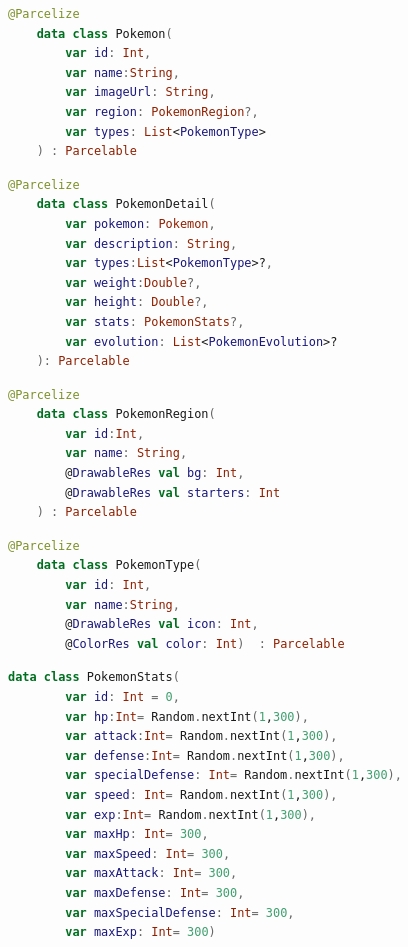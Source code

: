 \documentclass[a4paper, 12pt]{article}
\begin{document}
\begin{lstlisting}[caption={Pokemon Data Class.}, label={code:pk_class}, language=Kotlin]
    @Parcelize
    data class Pokemon(
        var id: Int,
        var name:String,
        var imageUrl: String,
        var region: PokemonRegion?,
        var types: List<PokemonType>
    ) : Parcelable
\end{lstlisting}

\begin{lstlisting}[caption={Pokemon Detail Data Class.}, label={code:pk_detail_class}, language=Kotlin]
    @Parcelize
    data class PokemonDetail(
        var pokemon: Pokemon,
        var description: String,
        var types:List<PokemonType>?,
        var weight:Double?,
        var height: Double?,
        var stats: PokemonStats?,
        var evolution: List<PokemonEvolution>?
    ): Parcelable
\end{lstlisting}

\begin{lstlisting}[caption={Pokemon Region Data Class.}, label={code:pk_region_class}, language=Kotlin]
    @Parcelize
    data class PokemonRegion(
        var id:Int, 
        var name: String,
        @DrawableRes val bg: Int,
        @DrawableRes val starters: Int
    ) : Parcelable
\end{lstlisting}

\begin{lstlisting}[caption={Pokemon Type Data Class.}, label={code:pk_type_class}, language=Kotlin]
    @Parcelize
    data class PokemonType(
        var id: Int, 
        var name:String,
        @DrawableRes val icon: Int,
        @ColorRes val color: Int)  : Parcelable

\end{lstlisting}

\begin{lstlisting}[caption={Pokemon Stats Data Class.}, label={code:pk_stats_class}, language=Kotlin]
    data class PokemonStats(
        var id: Int = 0,
        var hp:Int= Random.nextInt(1,300),
        var attack:Int= Random.nextInt(1,300),
        var defense:Int= Random.nextInt(1,300),
        var specialDefense: Int= Random.nextInt(1,300),
        var speed: Int= Random.nextInt(1,300),
        var exp:Int= Random.nextInt(1,300),
        var maxHp: Int= 300,
        var maxSpeed: Int= 300,
        var maxAttack: Int= 300,
        var maxDefense: Int= 300,
        var maxSpecialDefense: Int= 300,
        var maxExp: Int= 300)
    
\end{lstlisting}
\end{document}
